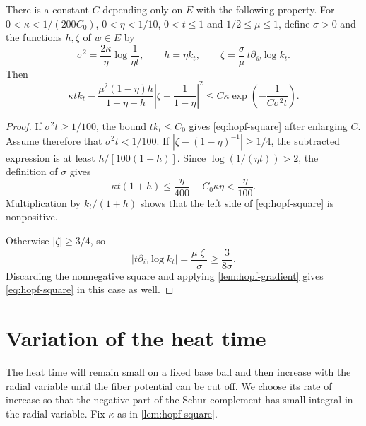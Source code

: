 \begin{lemma}\label{lem:hopf-square}
There is a constant $C$ depending only on $E$ with the following property. For $0<\kappa<1/(200C_0)$, $0<\eta<1/10$, $0<t\leq1$ and $1/2\leq\mu\leq1$, define $\sigma>0$ and the functions $h,\zeta$ of $w\in E$ by
\[
 \sigma^2=\frac{2\kappa}{\eta}\log\frac1{\eta t},\qquad
 h=\eta k_t,\qquad
 \zeta=\frac{\sigma}{\mu}\,t\partial_{\bar w}\log k_t.
\]
Then
\begin{equation}\label{eq:hopf-square}
 \kappa tk_t-
 \frac{\mu^2(1-\eta)h}{1-\eta+h}
       \left|\zeta-\frac1{1-\eta}\right|^2
 \leq C\kappa\exp\left(-\frac1{C\sigma^2t}\right).
\end{equation}
\end{lemma}
\begin{proof}
If $\sigma^2t\geq1/100$, the bound $tk_t\leq C_0$ gives \eqref{eq:hopf-square} after enlarging $C$.
Assume therefore that $\sigma^2t<1/100$. If
$|\zeta-(1-\eta)^{-1}|\geq1/4$, the subtracted expression is at least $h/[100(1+h)]$. Since $\log(1/(\eta t))>2$, the definition of $\sigma$ gives
\[
 \kappa t(1+h)\leq\frac{\eta}{400}+C_0\kappa\eta
 <\frac{\eta}{100}.
\]
Multiplication by $k_t/(1+h)$ shows that the left side of \eqref{eq:hopf-square} is nonpositive.

Otherwise $|\zeta|\geq3/4$, so
\[
 |t\partial_{\bar w}\log k_t|=\frac{\mu|\zeta|}{\sigma}
 \geq\frac3{8\sigma}.
\]
Discarding the nonnegative square and applying \cref{lem:hopf-gradient} gives \eqref{eq:hopf-square} in this case as well.
\end{proof}

\section{Variation of the heat time}

The heat time will remain small on a fixed base ball and then increase with the radial variable until the fiber potential can be cut off. We choose its rate of increase so that the negative part of the Schur complement has small integral in the radial variable. Fix $\kappa$ as in \cref{lem:hopf-square}.

